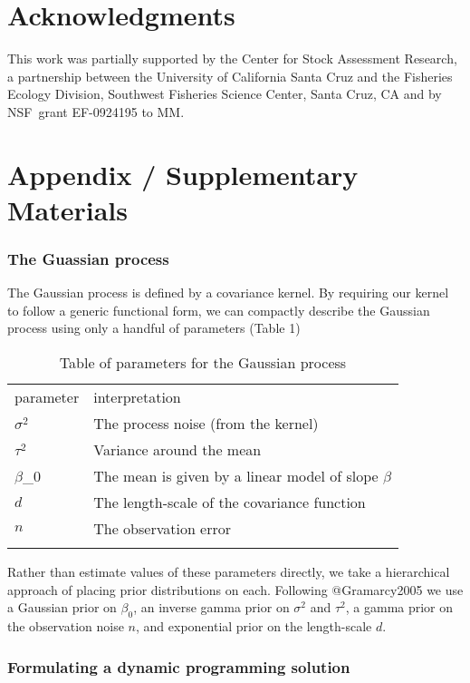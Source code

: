 \documentclass[author-year, review]{elsarticle} %
\begin{document}
\section{Acknowledgments}

This work was partially supported by the Center for Stock Assessment
Research, a partnership between the University of California Santa Cruz
and the Fisheries Ecology Division, Southwest Fisheries Science Center,
Santa Cruz, CA and by NSF~grant EF-0924195 to MM.

\section{Appendix / Supplementary Materials}

\subsubsection{The Guassian process}

The Gaussian process is defined by a covariance kernel. By requiring our
kernel to follow a generic functional form, we can compactly describe
the Gaussian process using only a handful of parameters (Table 1)

\begin{longtable}[c]{@{}ll@{}}
\hline\noalign{\medskip}
parameter & interpretation
\\\noalign{\medskip}
\hline\noalign{\medskip}
$\sigma^2$ & The process noise (from the kernel)
\\\noalign{\medskip}
$\tau^2$ & Variance around the mean
\\\noalign{\medskip}
$\beta$\_0 & The mean is given by a linear model of slope $\beta$
\\\noalign{\medskip}
$d$ & The length-scale of the covariance function
\\\noalign{\medskip}
$n$ & The observation error
\\\noalign{\medskip}
\hline
\noalign{\medskip}
\caption{Table of parameters for the Gaussian process}
\end{longtable}

Rather than estimate values of these parameters directly, we take a
hierarchical approach of placing prior distributions on each. Following
@Gramarcy2005 we use a Gaussian prior on $\beta_0$, an inverse gamma
prior on $\sigma^2$ and $\tau^2$, a gamma prior on the observation noise
$n$, and exponential prior on the length-scale $d$.

\subsubsection{Formulating a dynamic programming solution}
\end{document}
